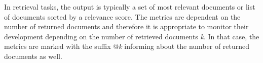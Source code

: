     In retrieval tasks, the output is typically a set of most relevant documents or list of documents sorted by a relevance score. The metrics are dependent on the number of returned documents and therefore it is appropriate to monitor their development depending on the number of retrieved documents \emph{k}. In that case, the metrics are marked with the suffix @\emph{k} informing about the number of returned documents as well. 